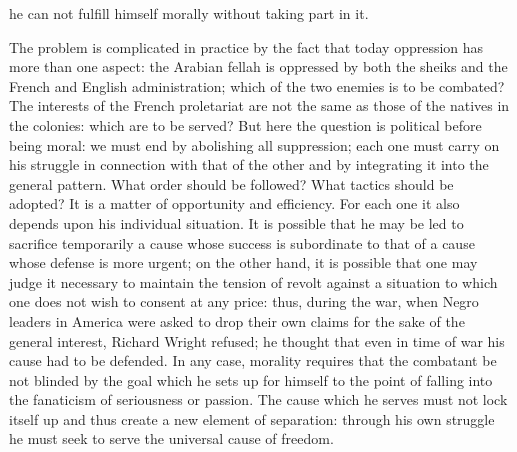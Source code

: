 \documentclass[11pt]{article}
\begin{document}
{{he can not fulfill himself morally without taking part in it.

The problem is complicated in practice by the fact that today oppression has more than one aspect: the Arabian fellah is oppressed by both the sheiks and the French and English administration; which of the two enemies is to be combated? The interests of the French proletariat are not the same as those of the natives in the colonies: which are to be served? But here the question is political before being moral: we must end by abolishing all suppression; each one must carry on his struggle in connection with that of the other and by integrating it into the general pattern. What order should be followed? What tactics should be adopted? It is a matter of opportunity and efficiency. For each one it also depends upon his individual situation. It is possible that he may be led to sacrifice temporarily a cause whose success is subordinate to that of a cause whose defense is more urgent; on the other hand, it is possible that one may judge it necessary to maintain the tension of revolt against a situation to which one does not wish to consent at any price: thus, during the war, when Negro leaders in America were asked to drop their own claims for the sake of the general interest, Richard Wright refused; he thought that even in time of war his cause had to be defended. In any case, morality requires that the combatant be not blinded by the goal which he sets up for himself to the point of falling into the fanaticism of seriousness or passion. The cause which he serves must not lock itself up and thus create a new element of separation: through his own struggle he must seek to serve the universal cause of freedom.

}}
\end{document}
